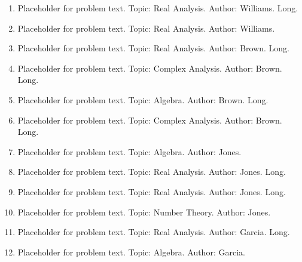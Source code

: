 \documentclass[12pt]{article}
\newcommand{\answer}[1]{} %
\newcommand{\topic}[1]{} %
\renewcommand{\author}[1]{} %
\newcommand{\isLong}[1]{} %
\begin{document}
\begin{enumerate}
\item Placeholder for problem text. Topic: Real Analysis. Author: Williams. Long.
\answer{Answer here}
\topic{Real Analysis}
\author{Williams}
\isLong{true}

\item Placeholder for problem text. Topic: Real Analysis. Author: Williams. 
\answer{Answer here}
\topic{Real Analysis}
\author{Williams}
\isLong{false}

\item Placeholder for problem text. Topic: Real Analysis. Author: Brown. Long.
\answer{Answer here}
\topic{Real Analysis}
\author{Brown}
\isLong{true}

\item Placeholder for problem text. Topic: Complex Analysis. Author: Brown. Long.
\answer{Answer here}
\topic{Complex Analysis}
\author{Brown}
\isLong{true}

\item Placeholder for problem text. Topic: Algebra. Author: Brown. Long.
\answer{Answer here}
\topic{Algebra}
\author{Brown}
\isLong{true}

\item Placeholder for problem text. Topic: Complex Analysis. Author: Brown. Long.
\answer{Answer here}
\topic{Complex Analysis}
\author{Brown}
\isLong{true}

\item Placeholder for problem text. Topic: Algebra. Author: Jones. 
\answer{Answer here}
\topic{Algebra}
\author{Jones}
\isLong{false}

\item Placeholder for problem text. Topic: Real Analysis. Author: Jones. Long.
\answer{Answer here}
\topic{Real Analysis}
\author{Jones}
\isLong{true}

\item Placeholder for problem text. Topic: Real Analysis. Author: Jones. Long.
\answer{Answer here}
\topic{Real Analysis}
\author{Jones}
\isLong{true}

\item Placeholder for problem text. Topic: Number Theory. Author: Jones. 
\answer{Answer here}
\topic{Number Theory}
\author{Jones}
\isLong{false}

\item Placeholder for problem text. Topic: Real Analysis. Author: Garcia. Long.
\answer{Answer here}
\topic{Real Analysis}
\author{Garcia}
\isLong{true}

\item Placeholder for problem text. Topic: Algebra. Author: Garcia. 
\answer{Answer here}
\topic{Algebra}
\author{Garcia}
\isLong{false}


\end{enumerate}
\end{document}
